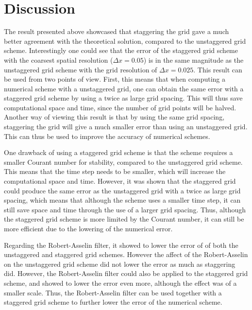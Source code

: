 \section{Discussion}

The result presented above showcased that staggering the grid gave a much better agreement with the theoretical solution, compared to the unstaggered grid scheme. Interestingly one could see that the error of the staggered grid scheme with the coarsest spatial resolution ($\Delta x = 0.05$) is in the same magnitude as the unstaggered grid scheme with the grid resolution of $\Delta x = 0.025$. This result can be used from two points of view. First, this means that when computing a numerical scheme with a unstaggered grid, one can obtain the same error with a staggered grid scheme by using a twice as large grid spacing. This will thus save computational space and time, since the number of grid points will be halved. Another way of viewing this result is that  by using the same grid spacing, staggering the grid will give a much smaller error than using an unstaggered grid. This can thus be used to improve the accuracy of numerical schemes.

One drawback of using a staggered grid scheme is that the scheme requires a smaller Courant number for stability, compared to the unstaggered grid scheme. This means that the time step needs to be smaller, which will increase the computational space and time. However, it was shown that the staggered grid could produce the same error as the unstaggered grid with a twice as large grid spacing, which means that although the scheme uses a smaller time step, it can still save space and time through the use of a larger grid spacing. Thus, although the staggered grid scheme is more limited by the Courant number, it can still be more efficient due to the lowering of the numerical error.


Regarding the Robert-Asselin filter, it showed to lower the error of of both the unstaggered and staggered grid schemes. However the affect of the Robert-Asselin on the unstaggered grid scheme did not lower the error as much as staggering did. However, the Robert-Asselin filter could also be applied to the staggered grid scheme, and showed to lower the error even more, although the effect was of a smaller scale. Thus, the Robert-Asselin filter can be used together with a staggered grid scheme to further lower the error of the numerical scheme. 
